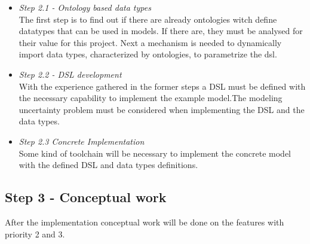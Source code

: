 \begin{itemize}
\item \emph{Step 2.1 - Ontology based data types}\\
The first step is to find out if there are already ontologies witch define datatypes that can be used in models. If there are, they must be analysed for their value for this project.
Next a mechanism is needed to dynamically import data types, characterized by ontologies, to parametrize the dsl.
\item \emph{Step 2.2 - DSL development}\\
With the experience gathered in the former steps a DSL must be defined with the necessary capability to implement the example model.The modeling uncertainty problem must be considered when implementing the DSL and the data types.
\item \emph{Step 2.3 Concrete Implementation}\\
Some kind of toolchain will be necessary to implement the concrete model with the defined DSL and data types definitions.
\end{itemize}

\subsection{Step 3 - Conceptual work}
After the implementation conceptual work will be done on the features with priority 2 and 3.

